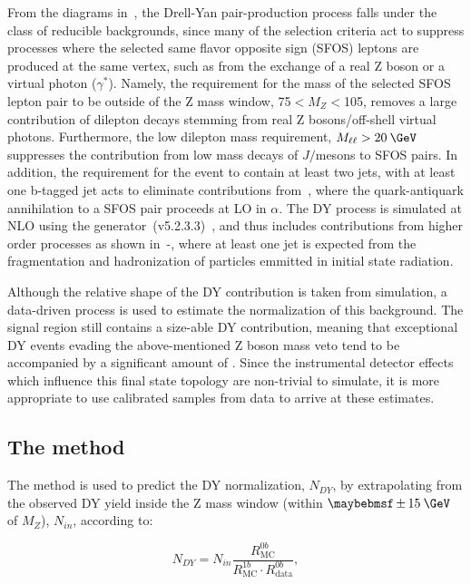 From the diagrams in~, the Drell-Yan pair-production process falls under the class of reducible backgrounds, since many of the selection criteria act to suppress processes where the selected same flavor opposite sign (SFOS) leptons are produced at the same vertex, such as from the exchange of a real Z boson or a virtual photon ($\gamma^{*}$). Namely, the requirement for the mass of the selected SFOS lepton pair to be outside of the Z mass window, 75\:\GeV$< M_{Z} <$105\:\GeV, removes a large contribution of dilepton decays stemming from real Z bosons/off-shell virtual photons. Furthermore, the low dilepton mass requirement, $M_{\ell\ell}>20\:\GeV$ suppresses the contribution from low mass decays of $J/$\psi mesons to SFOS pairs. In addition, the requirement for the event to contain at least two jets, with at least one b-tagged jet acts to eliminate contributions from~, where the quark-antiquark annihilation to a SFOS pair proceeds at LO in $\alpha$. The DY process is simulated at NLO using the \AMCATNLO generator~(v5.2.3.3)~\cite{Alwall:2014hca}, and thus includes contributions from higher order processes as shown in~-, where at least one jet is expected from the fragmentation and hadronization of particles emmitted in initial state radiation.

Although the relative shape of the DY contribution is taken from simulation, a data-driven process is used to estimate the normalization of this background. The signal region still contains a size-able DY contribution, meaning that exceptional DY events evading the above-mentioned Z boson mass veto tend to be accompanied by a significant amount of \ptmiss. Since the instrumental detector effects which influence this final state topology are non-trivial to simulate, it is more appropriate to use calibrated samples from data to arrive at these estimates.  

\subsection{The \Rinout method}

The method is used to predict the DY normalization, $N_{DY}$, by extrapolating from the observed DY yield inside the Z mass window (within $\pm15\:\GeV$ of $M_{Z}$), $N_{in}$, according to:

\begin{equation}
  N_{DY} = N_{in}\frac{R^{0b}_{\mathrm{MC}}}{R^{1b}_{\mathrm{MC}}\cdot R^{0b}_{\mathrm{data}}},
  \label{eq:NDY}
\end{equation}

